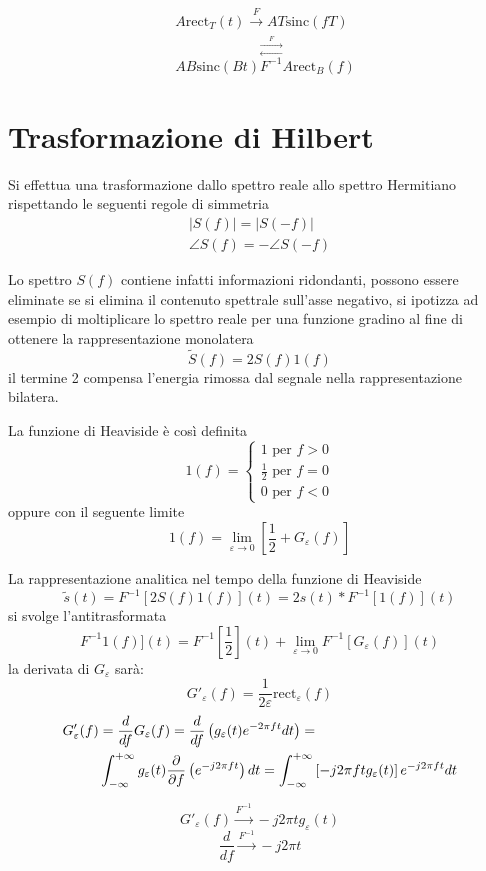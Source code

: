 $$\begin{aligned}
&A\text{rect}_T(t) \stackrel{F}{\longrightarrow} AT\text{sinc}(fT)\\
&AB\text{sinc}(Bt)
\stackrel{\stackrel{F}{\longrightarrow}}{\stackrel{\longleftarrow}{F^{-1}}}
A\text{rect}_B(f)
\end{aligned}$$


\section{Trasformazione di Hilbert}
Si effettua una trasformazione dallo spettro reale allo spettro Hermitiano
rispettando le seguenti regole di simmetria
$$\begin{aligned}
|S(f)| = |S(-f)| \\
\angle S(f) = -\angle S(-f)
\end{aligned}$$

Lo spettro $S(f)$ contiene infatti informazioni ridondanti, possono essere
eliminate se si elimina il contenuto spettrale sull'asse negativo, si ipotizza
ad esempio di moltiplicare lo spettro reale per una funzione gradino al fine di
ottenere la rappresentazione monolatera
$$
\tilde{S}(f) = 2S(f)1(f)
$$
il termine 2 compensa l'energia rimossa dal segnale nella rappresentazione
bilatera.

La funzione di Heaviside è così definita
$$
1(f) = \begin{cases}
1 \text{ per } f> 0 \\
\frac{1}{2} \text{ per } f=0\\
0 \text{ per } f<0
\end{cases}
$$
oppure con il seguente limite
$$
1(f) = \lim_{\varepsilon\to0} \left[ \frac{1}{2} + G_\varepsilon(f) \right]
$$

La rappresentazione analitica nel tempo della funzione di Heaviside
$$
\tilde{s}(t) = F^{-1} [ 2S(f)1(f) ](t) = 2s(t) \ast F^{-1}[1(f)](t)
$$
si svolge l'antitrasformata
$$
F^{-1} 1(f)](t) = F^{-1}\left[ \frac{1}{2} \right](t) +  \lim_{\varepsilon \to
0}F^{-1}[G_\varepsilon (f)] (t)
$$
la derivata di $G_\varepsilon$ sarà:
$$
G'_\varepsilon (f) = \frac{1}{2\varepsilon} \text{rect}_\varepsilon(f)
$$
$$\begin{aligned}
G'_\varepsilon(f) &= \frac{d}{df} G_\varepsilon(f) = \frac{d}{df} \left(
g_\varepsilon(t) e^{-2\pi ft} dt \right) = \\
&\int_{-\infty}^{+\infty}
g_\varepsilon(t) \frac{\partial}{\partial f} \left( e^{-j2\pi ft} \right)dt =
\int_{-\infty}^{+\infty} \left[ -j2\pi ft g_\varepsilon(t) \right]e^{-j2\pi ft} dt
\end{aligned}$$

$$
G'_\varepsilon (f) \stackrel{F^{-1}}{\longrightarrow} -j2\pi t g_\varepsilon(t)
$$
$$
\frac{d}{df} \stackrel{F^{-1}}{\longrightarrow} -j2\pi t
$$

